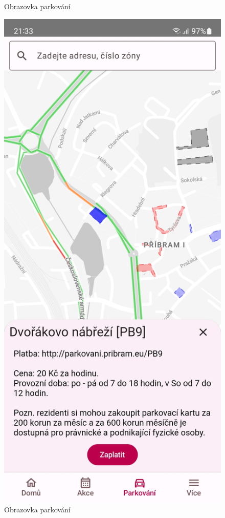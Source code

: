 \begin{figure}[H]
    \caption{Obrazovka parkování}
  \endminipage\hfill
    \includegraphics[width=\linewidth]{screens/3b.jpg}
    \caption{Obrazovka parkování}
  \endminipage\hfill
\end{figure}

